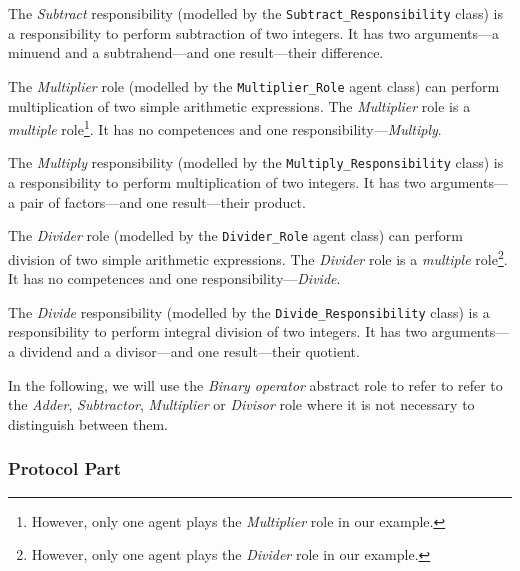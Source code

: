 The \textit{Subtract} responsibility (modelled by the \texttt{Subtract\_Responsibility} class) is a responsibility to perform subtraction of two integers.
It has two arguments---a minuend and a subtrahend---and one result---their difference.

The \textit{Multiplier} role (modelled by the \texttt{Multiplier\_Role} agent class) can perform multiplication of two simple arithmetic expressions.
The \textit{Multiplier} role is a \textit{multiple} role\footnote{However, only one agent plays the \textit{Multiplier} role in our example.}.
It has no competences and one responsibility---\textit{Multiply}.

The \textit{Multiply} responsibility (modelled by the \texttt{Multiply\_Responsibility} class) is a responsibility to perform multiplication of two integers.
It has two arguments---a pair of factors---and one result---their product.

The \textit{Divider} role (modelled by the \texttt{Divider\_Role} agent class) can perform division of two simple arithmetic expressions.
The \textit{Divider} role is a \textit{multiple} role\footnote{However, only one agent plays the \textit{Divider} role in our example.}.
It has no competences and one responsibility---\textit{Divide}.

The \textit{Divide} responsibility (modelled by the \texttt{Divide\_Responsibility} class) is a responsibility to perform integral division of two integers.
It has two arguments---a dividend and a divisor---and one result---their quotient.

In the following, we will use the \textit{Binary operator} abstract role to refer to refer to the \textit{Adder}, \textit{Subtractor}, \textit{Multiplier} or \textit{Divisor} role where it is not necessary to distinguish between them.

\subsubsection*{Protocol Part}

